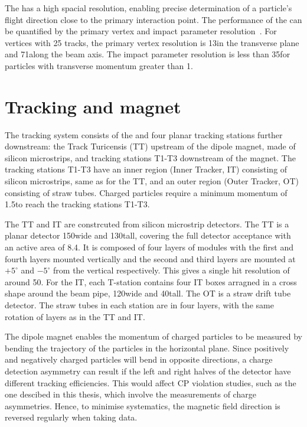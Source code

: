 The \velo has a high spacial resolution, enabling precise determination of a particle's flight direction close to the primary interaction point. The performance of the \velo can be quantified by the primary vertex and impact parameter resolution~\cite{LHCb-DP-2014-001}. For vertices with 25 tracks, the primary vertex resolution is 13\mum in the transverse plane and 71\mum along the beam axis. The impact parameter resolution is less than 35\mum for particles with transverse momentum greater than 1\gevc.

\section{Tracking and magnet}

The \lhcb tracking system consists of the \velo and four planar tracking stations further downstream: the Track Turicensis (TT) upstream of the dipole magnet, made of silicon microstrips, and tracking stations T1-T3 downstream of the magnet. The tracking stations T1-T3 have an inner region (Inner Tracker, IT) consisting of silicon microstrips, same as for the TT, and an outer region (Outer Tracker, OT) consisting of straw tubes. Charged particles require a minimum momentum of 1.5\gevc to reach the tracking stations T1-T3.

The TT and IT are constrcuted from silicon microstrip detectors. The TT is a planar detector 150\cm wide and 130\cm tall, covering the full detector acceptance with an active area of 8.4\ma. It is composed of four layers of modules with the first and fourth layers mounted vertically and the second and third layers are mounted at $+5^{\circ}$ and $-5^{\circ}$ from the vertical respectively. This gives a single hit resolution of around 50\mum. For the IT, each T-station contains four IT boxes arragned in a cross shape around the beam pipe, 120\cm wide and 40\cm tall. The OT is a straw drift tube detector. The straw tubes in each station are in four layers, with the same rotation of layers as in the TT and IT.

The dipole magnet enables the momentum of charged particles to be measured by bending the trajectory of the particles in the horizontal plane. Since positively and negatively charged particles will bend in opposite directions, a charge detection asymmetry can result if the left and right halves of the detector have different tracking efficiencies. This would affect CP violation studies, such as the one descibed in this thesis, which involve the measurements of charge asymmetries. Hence, to minimise systematics, the magnetic field direction is reversed regularly when taking data.

